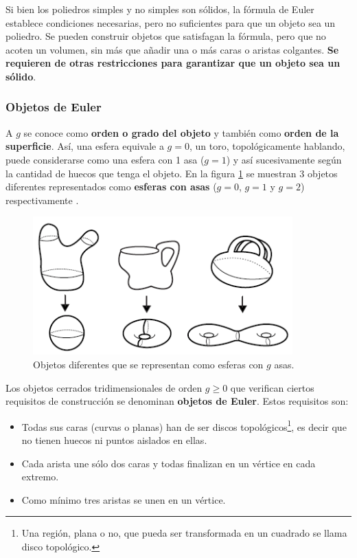     Si bien los poliedros simples y no simples son sólidos, la fórmula de Euler establece condiciones necesarias, pero no suficientes para que un objeto sea un poliedro. Se pueden construir objetos que satisfagan la fórmula, pero que no acoten un volumen, sin más que añadir una o más caras o aristas colgantes. \textbf{Se requieren de otras restricciones para garantizar que un objeto sea un sólido}.

\subsubsection{ Objetos de Euler }
A $g$ se conoce como \textbf{orden o grado del objeto} y también como \textbf{orden de la superficie}. Así, una esfera equivale a $g = 0 $, un toro, topológicamente hablando, puede considerarse como una esfera con 1 asa ($g = 1$) y así sucesivamente según la cantidad de huecos que tenga el objeto. En la figura \ref{fig:asas} se muestran 3 objetos diferentes representados  como \textbf{esferas con asas} ($g = 0$, $g = 1$ y $g = 2$) respectivamente  \citep{Annenberg}.
 
   \begin{figure}[ht]
    \includegraphics[width=10cm]{Img/GEO/geo-asas.png}
    \centering
    \caption{\footnotesize{Objetos diferentes que se representan como esferas con $g$ asas.}}
    \label{fig:asas}
    \end{figure}
 
 Los objetos cerrados tridimensionales de orden $g \geq 0 $ que verifican ciertos requisitos de construcción se denominan \textbf{objetos de Euler}. Estos requisitos son:
\begin{itemize}
\item Todas sus caras (curvas o planas) han de ser discos topológicos\footnote{Una región, plana o no, que pueda ser transformada en un cuadrado se llama disco topológico.}, es decir que no tienen huecos ni puntos aislados en ellas. 
\item Cada arista une sólo dos caras y todas finalizan en un vértice en
cada extremo.
\item Como mínimo tres aristas se unen en un vértice. 
\end{itemize}

